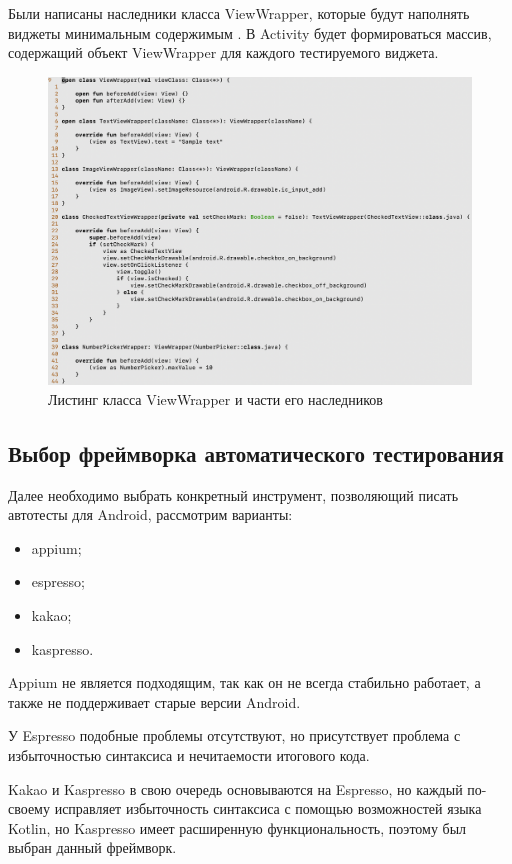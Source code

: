 \documentclass[a4paper,14pt]{extarticle} %
\begin{document}
	Были написаны наследники класса ViewWrapper, которые будут наполнять виджеты минимальным содержимым \ris{\ref{fig:wrapper}}. В Activity будет формироваться массив, содержащий объект ViewWrapper для каждого тестируемого виджета.
	
	\begin{figure}[tbh]
		\includegraphics[width=\textwidth]{wrapper}
		\caption{Листинг класса ViewWrapper и части его наследников}
		\label{fig:wrapper}
	\end{figure}
	
	\subsection{Выбор фреймворка автоматического тестирования}
	
	Далее необходимо выбрать конкретный инструмент, позволяющий писать автотесты для Android, рассмотрим варианты:
	\begin{itemize}
		\item appium;
		\item espresso;
		\item kakao;
		\item kaspresso.
	\end{itemize}
	
	Appium не является подходящим, так как он не всегда стабильно работает, а также не поддерживает старые версии Android. 
	
	У Espresso подобные проблемы отсутствуют, но присутствует проблема с избыточностью синтаксиса и нечитаемости итогового кода. 
	
	Kakao и Kaspresso в свою очередь основываются на Espresso, но каждый по-своему исправляет избыточность синтаксиса с помощью возможностей языка Kotlin, но Kaspresso имеет расширенную функциональность, поэтому был выбран данный фреймворк.
	
\end{document}
